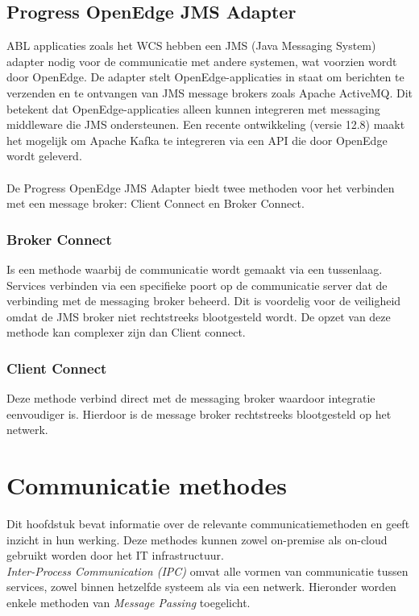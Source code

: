 \subsection{Progress OpenEdge JMS Adapter}
ABL applicaties zoals het WCS hebben een JMS (Java Messaging System) adapter nodig voor de communicatie met andere systemen, wat voorzien wordt door OpenEdge.
De adapter stelt OpenEdge-applicaties in staat om berichten te verzenden en te ontvangen van JMS message brokers zoals Apache ActiveMQ. 
Dit betekent dat OpenEdge-applicaties alleen kunnen integreren met messaging middleware die JMS ondersteunen. 
Een recente ontwikkeling (versie 12.8) maakt het mogelijk om Apache Kafka te integreren via een API die door OpenEdge wordt geleverd.
\\\\
De Progress OpenEdge JMS Adapter biedt twee methoden voor het verbinden met een message broker: Client Connect en Broker Connect.
\subsubsection{Broker Connect}
Is een methode waarbij de communicatie wordt gemaakt via een tussenlaag. Services verbinden via een specifieke poort op de communicatie server
dat de verbinding met de messaging broker beheerd. Dit is voordelig voor de veiligheid omdat de JMS broker niet rechtstreeks blootgesteld wordt.
De opzet van deze methode kan complexer zijn dan Client connect.

\subsubsection{Client Connect}
Deze methode verbind direct met de messaging broker waardoor integratie eenvoudiger is. 
Hierdoor is de message broker rechtstreeks blootgesteld op het netwerk.


\section{Communicatie methodes}
Dit hoofdstuk bevat informatie over de relevante communicatiemethoden en geeft inzicht in hun werking.
Deze methodes kunnen zowel on-premise als on-cloud gebruikt worden door het IT infrastructuur.
\\
\emph{Inter-Process Communication (IPC)} omvat alle vormen van communicatie tussen services, 
zowel binnen hetzelfde systeem als via een netwerk. 
Hieronder worden enkele methoden van \emph{Message Passing} toegelicht.

